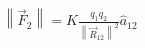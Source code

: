 \documentclass[preview]{standalone}
\begin{document}
\begin{align*}
\left\|\vec{F}_2\right\| = K \frac{q_1 q_2}{\left\|\vec{R}_{12}\right\|^2} \hat{a}_{12}
\end{align*}
\end{document}
